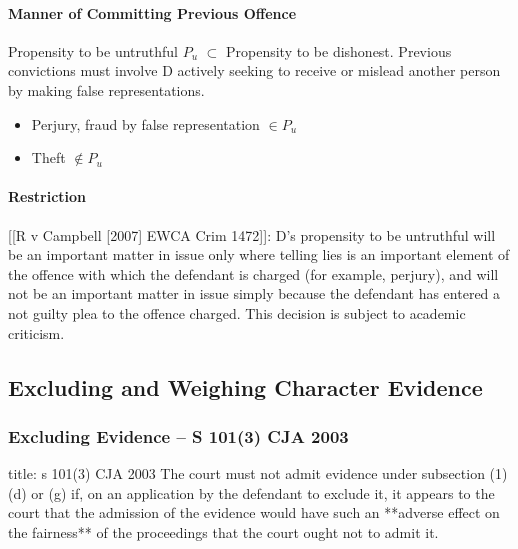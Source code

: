 \documentclass[
]{article}
\newenvironment{Shaded}{}{}
\newcommand{\NormalTok}[1]{#1}
\providecommand{\tightlist}{%
  \setlength{\itemsep}{0pt}\setlength{\parskip}{0pt}}
\begin{document}
\hypertarget{manner-of-committing-previous-offence}{%
\paragraph{Manner of Committing Previous
Offence}\label{manner-of-committing-previous-offence}}

Propensity to be untruthful \(P_u\) \(\subset\) Propensity to be
dishonest. Previous convictions must involve D actively seeking to
receive or mislead another person by making false representations.

\begin{itemize}
\tightlist
\item
  Perjury, fraud by false representation \(\in P_u\)
\item
  Theft \(\notin P_u\)
\end{itemize}

\hypertarget{restriction}{%
\paragraph{Restriction}\label{restriction}}

{[}{[}R v Campbell {[}2007{]} EWCA Crim 1472{]}{]}: D's propensity to be
untruthful will be an important matter in issue only where telling lies
is an important element of the offence with which the defendant is
charged (for example, perjury), and will not be an important matter in
issue simply because the defendant has entered a not guilty plea to the
offence charged. This decision is subject to academic criticism.

\hypertarget{excluding-and-weighing-character-evidence}{%
\subsection{Excluding and Weighing Character
Evidence}\label{excluding-and-weighing-character-evidence}}

\hypertarget{excluding-evidence-s-1013-cja-2003}{%
\subsubsection{Excluding Evidence -- S 101(3) CJA
2003}\label{excluding-evidence-s-1013-cja-2003}}

\begin{Shaded}
\begin{Highlighting}[]
\NormalTok{title: s 101(3) CJA 2003}
\NormalTok{The court must not admit evidence under subsection (1)(d) or (g) if, on an application by the defendant to exclude it, it appears to the court that the admission of the evidence would have such an **adverse effect on the fairness** of the proceedings that the court ought not to admit it.}
\end{Highlighting}
\end{Shaded}
\end{document}
